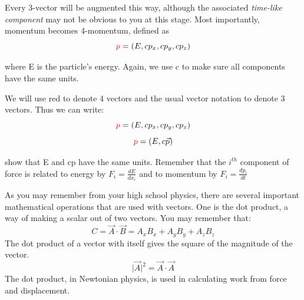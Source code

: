 \noindent Every 3-vector will be augmented this way, although the associated {\it time-like component} may not be obvious to you at this stage.  Most importantly, momentum becomes 4-momentum, defined as
\begin{equation}  
{\color{red} p}=(E,cp_x, cp_y, cp_z)  
\end{equation}

where E is the particle's energy. Again, we use c to make sure all components have the same units.
	 
We will use red to denote 4 vectors and the usual vector notation to denote 3 vectors.  Thus we can write:
\begin{equation} 
\textcolor{red}{p}=(E,cp_x, cp_y, cp_z)  
\end{equation}  		   
\begin{equation} 
{\color{red} p}=(E,c\vec{p})  
\end{equation} 
\vspace{.2cm} 
\begin{minipage}{0.9\textwidth} 
\begin{framed}
\begin{exercise}
{show that E and cp have the same units. Remember that the $i^{th}$ component of force is related to energy by $F_i=\frac{dE}{dx_i}$
 and to momentum by $F_i = \frac{dp_i}{dt}$}
\end{exercise}
\end{framed} 
\end{minipage}
\vspace{.2cm}



As you may remember from your high school physics, there are several important mathematical operations that are used with vectors.  One is the dot product, a way of making a scalar out of two vectors.  You may remember that:
\begin{equation}
      C= \vec A \cdot \vec B = A_xB_x +A_yB_y +A_zB_z 
\end{equation}
The dot product of a vector with itself gives the square of the magnitude of the vector.
\begin{equation}      
     |{\vec{A}|^2} =\vec A \cdot \vec A  
\end{equation}	  
\noindent The dot product, in Newtonian physics, is used in calculating work from force and displacement.

